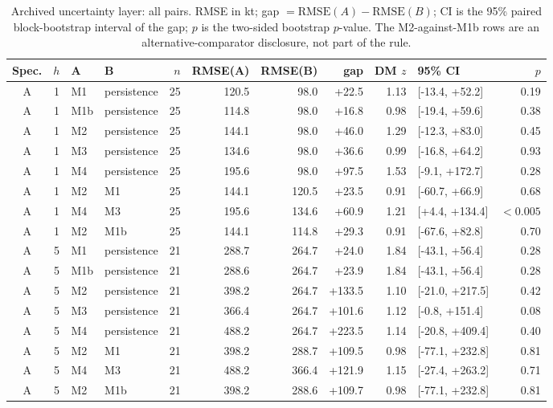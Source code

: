 \documentclass[preprint,11pt,authoryear]{elsarticle}
\theoremstyle{remark}
\newcommand{\RMSE}{\mathrm{RMSE}}
\begin{document}
\begin{table}[!htb]
\centering\scriptsize
\setlength{\tabcolsep}{3.5pt}
\caption{Archived uncertainty layer: all pairs. RMSE in kt; gap $=\RMSE(A)-\RMSE(B)$; CI is the 95\% paired block-bootstrap interval of the gap; $p$ is the two-sided bootstrap $p$-value. The M2-against-M1b rows are an alternative-comparator disclosure, not part of the rule.}
\label{tab:si_dm}
\scriptsize\setlength{\tabcolsep}{2.5pt}
\begin{tabular}{@{}ccllrrrrrlr@{}}
\toprule
Spec. & $h$ & A & B & $n$ & RMSE(A) & RMSE(B) & gap & DM $z$ & 95\% CI & $p$ \\
\midrule
A & 1 & M1 & persistence & 25 & 120.5 & 98.0 & +22.5 & 1.13 & [-13.4, +52.2] & 0.19 \\
A & 1 & M1b & persistence & 25 & 114.8 & 98.0 & +16.8 & 0.98 & [-19.4, +59.6] & 0.38 \\
A & 1 & M2 & persistence & 25 & 144.1 & 98.0 & +46.0 & 1.29 & [-12.3, +83.0] & 0.45 \\
A & 1 & M3 & persistence & 25 & 134.6 & 98.0 & +36.6 & 0.99 & [-16.8, +64.2] & 0.93 \\
A & 1 & M4 & persistence & 25 & 195.6 & 98.0 & +97.5 & 1.53 & [-9.1, +172.7] & 0.28 \\
A & 1 & M2 & M1 & 25 & 144.1 & 120.5 & +23.5 & 0.91 & [-60.7, +66.9] & 0.68 \\
A & 1 & M4 & M3 & 25 & 195.6 & 134.6 & +60.9 & 1.21 & [+4.4, +134.4] & $<0.005$ \\
A & 1 & M2 & M1b & 25 & 144.1 & 114.8 & +29.3 & 0.91 & [-67.6, +82.8] & 0.70 \\
A & 5 & M1 & persistence & 21 & 288.7 & 264.7 & +24.0 & 1.84 & [-43.1, +56.4] & 0.28 \\
A & 5 & M1b & persistence & 21 & 288.6 & 264.7 & +23.9 & 1.84 & [-43.1, +56.4] & 0.28 \\
A & 5 & M2 & persistence & 21 & 398.2 & 264.7 & +133.5 & 1.10 & [-21.0, +217.5] & 0.42 \\
A & 5 & M3 & persistence & 21 & 366.4 & 264.7 & +101.6 & 1.12 & [-0.8, +151.4] & 0.08 \\
A & 5 & M4 & persistence & 21 & 488.2 & 264.7 & +223.5 & 1.14 & [-20.8, +409.4] & 0.40 \\
A & 5 & M2 & M1 & 21 & 398.2 & 288.7 & +109.5 & 0.98 & [-77.1, +232.8] & 0.81 \\
A & 5 & M4 & M3 & 21 & 488.2 & 366.4 & +121.9 & 1.15 & [-27.4, +263.2] & 0.71 \\
A & 5 & M2 & M1b & 21 & 398.2 & 288.6 & +109.7 & 0.98 & [-77.1, +232.8] & 0.81 \\

\end{tabular}
\end{table}
\end{document}

